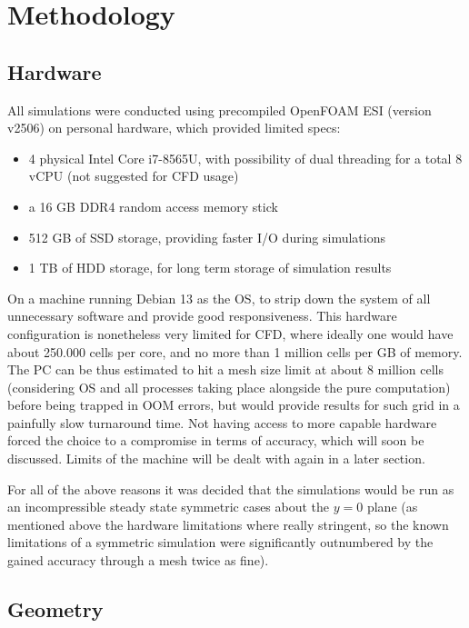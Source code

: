 \documentclass[12pt,a4paper]{article}
\begin{document}
\section{Methodology}

\subsection{Hardware}

All simulations were conducted using precompiled OpenFOAM ESI (version v2506) on personal hardware, which provided limited specs:

\begin{itemize}
    \item 4 physical Intel Core i7-8565U, with possibility of dual threading for a total 8 vCPU (not suggested for CFD usage)
    \item a 16 GB DDR4 random access memory stick
    \item 512 GB of SSD storage, providing faster I/O during simulations
    \item 1 TB of HDD storage, for long term storage of simulation results
\end{itemize}

On a machine running Debian 13 as the OS, to strip down the system of all unnecessary software and provide good responsiveness. This hardware configuration is nonetheless very limited for CFD, where ideally one would have about 250.000 cells per core, and no more than 1 million cells per GB of memory. The PC can be thus estimated to hit a mesh size limit at about 8 million cells (considering OS and all processes taking place alongside the pure computation) before being trapped in OOM errors, but would provide results for such grid in a painfully slow turnaround time. Not having access to more capable hardware forced the choice to a compromise in terms of accuracy, which will soon be discussed. Limits of the machine will be dealt with again in a later section.

For all of the above reasons it was decided that the simulations would be run as an incompressible steady state symmetric cases about the $y=0$ plane (as mentioned above the hardware limitations where really stringent, so the known limitations of a symmetric simulation were significantly outnumbered by the gained accuracy through a mesh twice as fine).

\subsection{Geometry}
\end{document}
